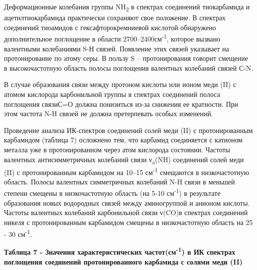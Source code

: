 Деформационные колебания группы NH\textsubscript{2} в спектрах
соединений тиокарбамида и ацетилтиокарбамида практически сохраняют свое
положение. В спектрах соединений тиоамидов с гексафторокремниевой
кислотой обнаружено дополнительное поглощение в области
2700--2400см\textsuperscript{-1}, которое вызвано валентными колебаниями
S-Н связей. Появление этих связей указывает на протонирование по атому
серы. В пользу S -- протонирования говорит смещение в высокочастотную
область полосы поглощения валентных колебаний связей С-N.

В случае образования связи между протоном кислоты или ионом меди (II) с
атомом кислорода карбонильной группы в спектрах соединений полоса
поглощения связиС=О должна понизиться из-за снижения ее кратности. При
этом частота N-H связей не должна претерпевать особых изменений.

Проведение анализа ИК-спектров соединений солей меди (II) с
протонированным карбамидом (таблица 7) осложнено тем, что карбамид
соединяется с катионом металла уже в протонированном через атом
кислорода состоянии. Частоты валентных антисимметричных колебаний связи
ν\textsubscript{a}(NH) соединений солей меди (II) с протонированным
карбамидом на 10--15 см\textsuperscript{-1} смещаются в низкочастотную
область. Полосы валентных симметричных колебаний N-H связи в меньшей
степени смещены в низкочастотную область (на 5-10
см\textsuperscript{-1}) в результате образования новых водородных связей
между аминогруппой и анионом кислоты. Частоты валентных колебаний
карбонильной связи ν(CO)в спектрах соединений никеля с протонированным
карбамидом смещены в низкочастотную область на 25 - 30
см\textsuperscript{-1}.

{\bfseries Таблица 7 - Значения характеристических
частот(см\textsuperscript{-1}) в ИК спектрах поглощения соединений
протонированного карбамида с солями меди (II)}

